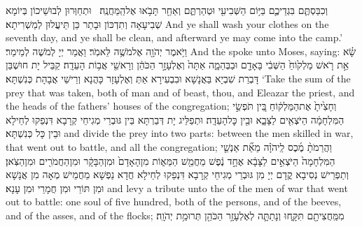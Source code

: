 {וְכִבַּסְתֶּ֧ם בִּגְדֵיכֶ֛ם בַּיּ֥וֹם הַשְּׁבִיעִ֖י וּטְהַרְתֶּ֑ם וְאַחַ֖ר תָּבֹ֥אוּ אֶל\maqqaf הַֽמַּחֲנֶֽה׃ \setuma }
{וּתְחַוְּרוּן לְבוּשֵׁיכוֹן בְּיוֹמָא שְׁבִיעָאָה וְתִדְכּוֹן וּבָתַר כֵּן תֵּיעֲלוּן לְמַשְׁרִיתָא׃}
{And ye shall wash your clothes on the seventh day, and ye shall be clean, and afterward ye may come into the camp.’}{}
{וַיֹּ֥אמֶר יְהֹוָ֖ה אֶל\maqqaf מֹשֶׁ֥ה לֵּאמֹֽר׃}
{וַאֲמַר יְיָ לְמֹשֶׁה לְמֵימַר׃}
{And the \lord\space spoke unto Moses, saying:}{}
{שָׂ֗א אֵ֣ת רֹ֤אשׁ מַלְק֙וֹחַ֙ הַשְּׁבִ֔י בָּאָדָ֖ם וּבַבְּהֵמָ֑ה אַתָּה֙ וְאֶלְעָזָ֣ר הַכֹּהֵ֔ן וְרָאשֵׁ֖י אֲב֥וֹת הָעֵדָֽה׃}
{קַבֵּיל יָת חוּשְׁבַּן דָּבְרַת שִׁבְיָא בַּאֲנָשָׁא וּבִבְעִירָא אַתְּ וְאֶלְעָזָר כָּהֲנָא וְרֵישֵׁי אֲבָהָת כְּנִשְׁתָּא׃}
{‘Take the sum of the prey that was taken, both of man and of beast, thou, and Eleazar the priest, and the heads of the fathers’ houses of the congregation;}{}
{וְחָצִ֙יתָ֙ אֶת\maqqaf הַמַּלְק֔וֹחַ בֵּ֚ין תֹּפְשֵׂ֣י הַמִּלְחָמָ֔ה הַיֹּצְאִ֖ים לַצָּבָ֑א וּבֵ֖ין כׇּל\maqqaf הָעֵדָֽה׃}
{וּתְפַלֵּיג יָת דְּבַרְתָּא בֵּין גּוּבְרֵי מְגִיחֵי קְרָבָא דִּנְפַקוּ לְחֵילָא וּבֵין כָּל כְּנִשְׁתָּא׃}
{and divide the prey into two parts: between the men skilled in war, that went out to battle, and all the congregation;}{}
{וַהֲרֵמֹתָ֨ מֶ֜כֶס לַֽיהֹוָ֗ה מֵאֵ֞ת אַנְשֵׁ֤י הַמִּלְחָמָה֙ הַיֹּצְאִ֣ים לַצָּבָ֔א אֶחָ֣ד נֶ֔פֶשׁ מֵחֲמֵ֖שׁ הַמֵּא֑וֹת מִן\maqqaf הָאָדָם֙ וּמִן\maqqaf הַבָּקָ֔ר וּמִן\maqqaf הַחֲמֹרִ֖ים וּמִן\maqqaf הַצֹּֽאן׃}
{וְתַפְרֵישׁ נְסִיבָא קֳדָם יְיָ מִן גּוּבְרֵי מְגִיחֵי קְרָבָא דִּנְפַקוּ לְחֵילָא חֲדָא נַפְשָׁא מֵחֲמֵישׁ מְאָה מִן אֲנָשָׁא וּמִן תּוֹרֵי וּמִן חֲמָרֵי וּמִן עָנָא׃}
{and levy a tribute unto the \lord\space of the men of war that went out to battle: one soul of five hundred, both of the persons, and of the beeves, and of the asses, and of the flocks;}{}
{מִמַּֽחֲצִיתָ֖ם תִּקָּ֑חוּ וְנָתַתָּ֛ה לְאֶלְעָזָ֥ר הַכֹּהֵ֖ן תְּרוּמַ֥ת יְהֹוָֽה׃}
